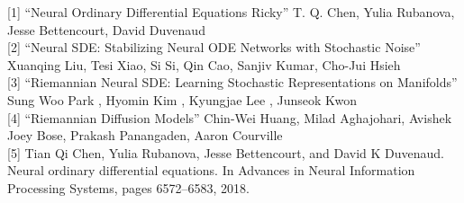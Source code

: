 \documentclass{article}
\begin{document}
[1] “Neural Ordinary Differential Equations Ricky” T. Q. Chen, Yulia Rubanova, Jesse Bettencourt, David Duvenaud \\

[2] “Neural SDE: Stabilizing Neural ODE Networks with Stochastic Noise” Xuanqing Liu, Tesi Xiao, Si Si, Qin Cao, Sanjiv Kumar, Cho-Jui Hsieh  \\

[3] “Riemannian Neural SDE: Learning Stochastic Representations on Manifolds” Sung Woo Park , Hyomin Kim , Kyungjae Lee , Junseok Kwon \\

[4] “Riemannian Diffusion Models” Chin-Wei Huang, Milad Aghajohari, Avishek Joey Bose, Prakash Panangaden, Aaron Courville \\

[5] Tian Qi Chen, Yulia Rubanova, Jesse Bettencourt, and David K Duvenaud. Neural ordinary differential equations. In Advances in Neural Information Processing Systems, pages 6572–6583, 2018. \\
\end{document}
